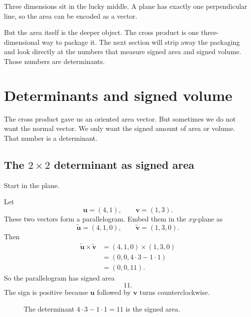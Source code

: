 Three dimensions sit in the lucky middle.  A plane has exactly one perpendicular line,
so the area can be encoded as a vector.

But the area itself is the deeper object.  The cross product is one three-dimensional way
to package it.  The next section will strip away the packaging and look directly at the
numbers that measure signed area and signed volume.  Those numbers are determinants.

\section{Determinants and signed volume}

The cross product gave us an oriented area vector.  But sometimes we do not want the
normal vector.  We only want the signed amount of area or volume.  That number is a
determinant.

\subsection{The \(2\times2\) determinant as signed area}

Start in the plane.

Let
\[
    \mathbf u=(4,1),
    \qquad
    \mathbf v=(1,3).
\]
These two vectors form a parallelogram.  Embed them in the \(xy\)-plane as
\[
    \widetilde{\mathbf u}=(4,1,0),
    \qquad
    \widetilde{\mathbf v}=(1,3,0).
\]
Then
\[
\begin{aligned}
\widetilde{\mathbf u}\times\widetilde{\mathbf v}
&=
(4,1,0)\times(1,3,0)\\
&=
(0,0,4\cdot3-1\cdot1)\\
&=
(0,0,11).
\end{aligned}
\]
So the parallelogram has signed area
\[
    11.
\]
The sign is positive because \(\mathbf u\) followed by \(\mathbf v\) turns
counterclockwise.

\begin{figure}[h]
\centering
{}
\caption{The determinant \(4\cdot3-1\cdot1=11\) is the signed area.}
\end{figure}

